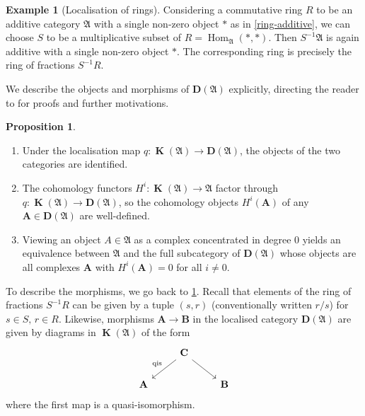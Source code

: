 \documentclass[a4paper]{article}
\theoremstyle{definition}
\newtheorem{prop}[defn]{Proposition}
\newtheorem{example}[defn]{Example}
\theoremstyle{remark}
\DeclareMathOperator{\Hom}{\text{Hom}}
\DeclareMathOperator{\kom}{{\mathbf{K}}}
\newcommand{\deri}{\mathbf{D}}
\begin{document}
\begin{example}[Localisation of rings]\label{example-ringlocal}
    Considering a commutative ring \(R\) to be an additive category
    \(\mathfrak{A}\) with a single non-zero object \(\ast\) as in
    \cref{ring-additive}, we can choose \(S\) to be a multiplicative subset of
    \(R=\Hom_{\mathfrak{A}}(\ast,\ast)\).  Then \(S^{-1}\mathfrak{A}\) is again
    additive with a single non-zero object \(\ast\). The corresponding ring is
    precisely the ring of fractions \(S^{-1}R\).
\end{example}

We describe the objects and morphisms of \(\deri(\mathfrak{A})\) explicitly,
directing the reader to  for proofs and
further motivations. 

\begin{prop}
    \begin{enumerate}
        \item Under the localisation map \(q: \kom(\mathfrak{A})\rightarrow
            \deri(\mathfrak{A})\), the objects of the two categories are
            identified.
        \item The cohomology functors \(H^i:\kom(\mathfrak{A})\rightarrow
            \mathfrak{A}\) factor through \(q: \kom(\mathfrak{A})\rightarrow
            \deri(\mathfrak{A})\), so the cohomology objects \(H^i(\mathbf{A})\)
            of any \(\mathbf{A}\in \deri(\mathfrak{A})\) are well-defined.
        \item Viewing an object \(A\in \mathfrak{A}\) as a complex concentrated
            in degree \(0\) yields an equivalence between \(\mathfrak{A}\) and
            the full subcategory of \(\deri(\mathfrak{A})\) whose objects are
            all complexes \(\mathbf{A}\) with \(H^i(\mathbf{A})=0\) for all
            \(i\neq 0\).
    \end{enumerate}
\end{prop}

To describe the morphisms, we go back to \cref{example-ringlocal}. Recall that
elements of the ring of fractions \(S^{-1}R\) can be given by a tuple \((s,r)\)
(conventionally written \(r/s\)) for \(s\in S,\, r\in R\).  Likewise, morphisms
\(\mathbf{A}\rightarrow \mathbf{B}\) in the localised category
\(\deri(\mathfrak{A})\) are given by diagrams in \(\kom(\mathfrak{A})\) of the
form
\[\begin{tikzcd}
    &\mathbf{C} \arrow[dl, "\text{qis}"'] \arrow[dr]& \\
    \mathbf{A}&&\mathbf{B}
\end{tikzcd}\]
where the first map is a quasi-isomorphism. 
\end{document}
